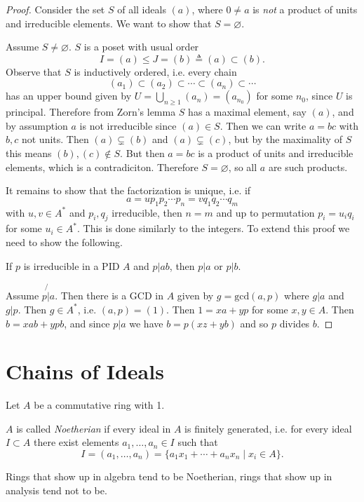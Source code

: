\begin{proof}
Consider the set $S$ of all ideals $(a)$, where $0 \neq a$ is \emph{not} a
product of units and irreducible elements. We want to show that $S =
\varnothing$.

Assume $S \neq \varnothing$. $S$ is a poset with usual order
$$
I = (a) \leq J = (b) \triangleq (a) \subset (b).
$$
Observe that $S$ is inductively ordered, i.e. every chain
$$
(a_1) \subset (a_2) \subset \cdots \subset (a_n) \subset \cdots
$$
has an upper bound given by $U = \bigcup_{n \geq 1} (a_n) = (a_{n_0})$ for
some $n_0$, since $U$ is principal. Therefore from Zorn's lemma $S$ has a maximal
element, say $(a)$, and by assumption $a$ is not irreducible since
$(a) \in S$. Then we can write $a = bc$ with $b, c$ not units. Then
$(a) \subsetneq (b)$ and $(a) \subsetneq (c)$, but by the maximality
of $S$ this means $(b), (c) \notin S$. But then $a = bc$ is a product
of units and irreducible elements, which is a contradiciton. Therefore
$S = \varnothing$, so all $a$ are such products.

It remains to show that the factorization is unique, i.e. if
$$
a = u p_1 p_2 \cdots p_n = v q_1 q_2 \cdots q_m
$$
with $u, v \in A^\ast$ and $p_i, q_j$ irreducible, then $n = m$ and up
to permutation $p_i = u_i q_i$ for some $u_i \in A^\ast$. This is done
similarly to the integers. To extend this proof we need to show the
following.

\begin{lemma}
If $p$ is irreducible in a PID $A$ and $p \vert ab$, then $p \vert a$ or $p
\vert b$.
\end{lemma}

Assume $p \not{\vert} a$. Then there is a GCD in $A$ given by
$g = \mathrm{gcd}(a, p)$ where $g \vert a$ and $g \vert p$. Then
$g \in A^\ast$, i.e. $(a, p) = (1)$. Then $1 = xa + yp$ for some $x, y
\in A$. Then $b = xab + ypb$, and since $p \vert a$ we have
$b = p(xz + yb)$ and so $p$ divides $b$.
\end{proof}

\section{Chains of Ideals}
Let $A$ be a commutative ring with 1.
\begin{defn}
$A$ is called \emph{Noetherian} if every ideal in $A$ is finitely
generated, i.e. for every ideal $I \subset A$ there exist elements
$a_1, \dots, a_n \in I$ such that
$$
  I
= (a_1, \dots, a_n)
= \{ a_1 x_1 + \cdots + a_n x_n \mid x_i \in A \}.
$$

Rings that show up in algebra tend to be Noetherian, rings that show
up in analysis tend not to be.
\end{defn}

